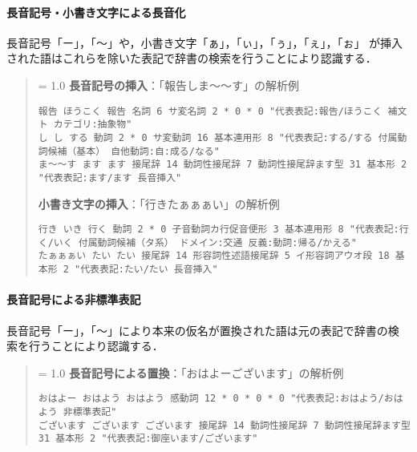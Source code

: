 \documentclass[a4j,titlepage]{jarticle}
\begin{document}
\paragraph{長音記号・小書き文字による長音化}

長音記号「ー」，「〜」や，小書き文字「ぁ」，「ぃ」，「ぅ」，「ぇ」，「ぉ」
が挿入された語はこれらを除いた表記で辞書の検索を行うことにより認識する．

\noindent
\begin{quote}
{\baselineskip = 1.0 \baselineskip
{\bf 長音記号の挿入}：「報告しま〜〜す」の解析例\vspace{-2ex}
\begin{verbatim}
報告 ほうこく 報告 名詞 6 サ変名詞 2 * 0 * 0 "代表表記:報告/ほうこく 補文ト カテゴリ:抽象物"
し し する 動詞 2 * 0 サ変動詞 16 基本連用形 8 "代表表記:する/する 付属動詞候補（基本） 自他動詞:自:成る/なる"
ま〜〜す ます ます 接尾辞 14 動詞性接尾辞 7 動詞性接尾辞ます型 31 基本形 2 "代表表記:ます/ます 長音挿入"
\end{verbatim}
{\bf 小書き文字の挿入}：「行きたぁぁぁい」の解析例\vspace{-2ex}
\begin{verbatim}
行き いき 行く 動詞 2 * 0 子音動詞カ行促音便形 3 基本連用形 8 "代表表記:行く/いく 付属動詞候補（タ系） ドメイン:交通 反義:動詞:帰る/かえる"
たぁぁぁい たい たい 接尾辞 14 形容詞性述語接尾辞 5 イ形容詞アウオ段 18 基本形 2 "代表表記:たい/たい 長音挿入"
\end{verbatim}
}
\end{quote}

\paragraph{長音記号による非標準表記}
長音記号「ー」，「〜」により本来の仮名が置換された語は元の表記で辞書の検
索を行うことにより認識する．

\noindent
\begin{quote}
{\baselineskip = 1.0 \baselineskip
{\bf 長音記号による置換}：「おはよーございます」の解析例\vspace{-2ex}
\begin{verbatim}
おはよー おはよう おはよう 感動詞 12 * 0 * 0 * 0 "代表表記:おはよう/おはよう 非標準表記"
ございます ございます ございます 接尾辞 14 動詞性接尾辞 7 動詞性接尾辞ます型 31 基本形 2 "代表表記:御座います/ございます"
\end{verbatim}
}
\end{quote}

\end{document}
